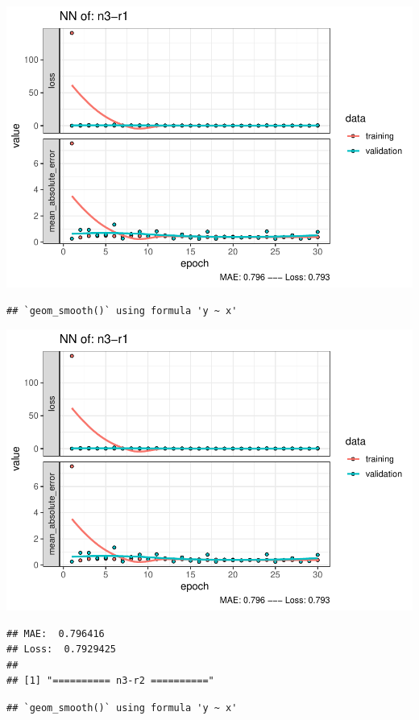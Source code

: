 \documentclass[
]{article}
\begin{document}
\includegraphics{project-code_files/figure-latex/unnamed-chunk-18-23.pdf}

\begin{verbatim}
## `geom_smooth()` using formula 'y ~ x'
\end{verbatim}

\includegraphics{project-code_files/figure-latex/unnamed-chunk-18-24.pdf}

\begin{verbatim}
## MAE:  0.796416
## Loss:  0.7929425 
## 
## [1] "========== n3-r2 =========="
\end{verbatim}

\begin{verbatim}
## `geom_smooth()` using formula 'y ~ x'
\end{verbatim}
\end{document}
